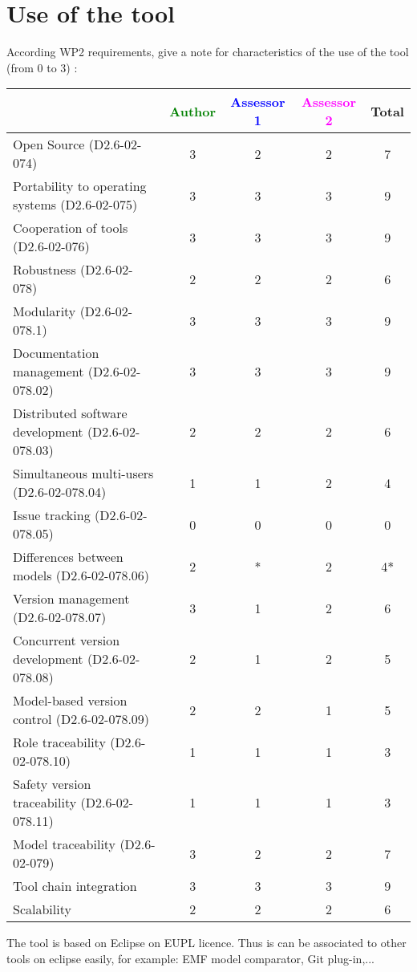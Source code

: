 \section{Use of the tool}


According WP2 requirements, give a note for characteristics of the use of the tool (from 0 to 3) :

\begin{tabular}{|l | c | c | c | c|}
\hline
& \textcolor{green}{Author} & \textcolor{blue}{Assessor 1} & \textcolor{magenta}{Assessor 2} & Total \\
\hline 
Open Source (D2.6-02-074) & 3 & 2 & 2 & 7 \\
\hline 
Portability to operating systems (D2.6-02-075) & 3 & 3 & 3 & 9 \\
\hline
Cooperation of tools (D2.6-02-076) & 3 & 3 & 3 & 9 \\
\hline
Robustness (D2.6-02-078) & 2 & 2 & 2 & 6 \\
\hline
Modularity (D2.6-02-078.1) & 3 & 3 & 3 & 9 \\
\hline
Documentation management (D2.6-02-078.02) & 3 & 3 & 3 & 9 \\
\hline
Distributed software development (D2.6-02-078.03)  & 2 & 2 & 2 & 6 \\
\hline
Simultaneous multi-users (D2.6-02-078.04)   & 1 & 1 & 2 & 4 \\
\hline
Issue tracking (D2.6-02-078.05) & 0 & 0 & 0 & 0 \\
\hline
Differences between models (D2.6-02-078.06) & 2 & * & 2 & 4* \\
\hline
Version management (D2.6-02-078.07) & 3 & 1 & 2 & 6 \\
\hline
Concurrent version development (D2.6-02-078.08) & 2 & 1 & 2 & 5 \\
\hline
Model-based version control (D2.6-02-078.09) & 2 & 2 & 1 & 5 \\
\hline
Role traceability (D2.6-02-078.10) & 1 & 1 & 1 & 3 \\
\hline
Safety version traceability (D2.6-02-078.11) & 1 & 1 & 1 & 3 \\
\hline
Model traceability (D2.6-02-079) & 3 & 2 & 2 & 7 \\
\hline
Tool chain integration & 3 & 3 & 3 & 9 \\
\hline
Scalability & 2 & 2 & 2 & 6 \\
\hline
\end{tabular}

\begin{author_comment}
The tool is based on Eclipse on EUPL licence. Thus is can be associated to  other tools on eclipse easily, for example: EMF model comparator, Git plug-in,...
\end{author_comment}

